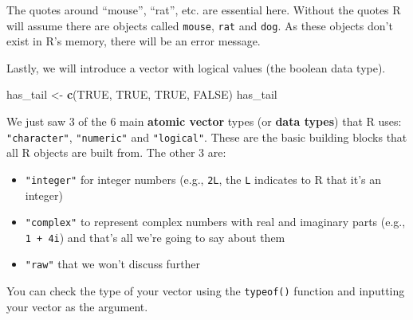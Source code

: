 \documentclass[
]{book}
\newenvironment{Shaded}{\begin{snugshade}}{\end{snugshade}}
\newcommand{\ConstantTok}[1]{\textcolor[rgb]{0.56,0.35,0.01}{#1}}
\newcommand{\FunctionTok}[1]{\textcolor[rgb]{0.13,0.29,0.53}{\textbf{#1}}}
\newcommand{\NormalTok}[1]{#1}
\newcommand{\OtherTok}[1]{\textcolor[rgb]{0.56,0.35,0.01}{#1}}
\providecommand{\tightlist}{%
  \setlength{\itemsep}{0pt}\setlength{\parskip}{0pt}}
\begin{document}
The quotes around ``mouse'', ``rat'', etc. are essential here. Without the quotes R
will assume there are objects called \texttt{mouse}, \texttt{rat} and \texttt{dog}. As these objects
don't exist in R's memory, there will be an error message.

Lastly, we will introduce a vector with logical values (the boolean data type).

\begin{Shaded}
\begin{Highlighting}[]
\NormalTok{has\_tail }\OtherTok{\textless{}{-}} \FunctionTok{c}\NormalTok{(}\ConstantTok{TRUE}\NormalTok{, }\ConstantTok{TRUE}\NormalTok{, }\ConstantTok{TRUE}\NormalTok{, }\ConstantTok{FALSE}\NormalTok{)}
\NormalTok{has\_tail }
\end{Highlighting}
\end{Shaded}

We just saw 3 of the 6 main \textbf{atomic vector} types (or \textbf{data types}) that R
uses: \texttt{"character"}, \texttt{"numeric"} and \texttt{"logical"}. These are the basic building blocks that all R objects are built from. The other 3 are:

\begin{itemize}
\tightlist
\item
  \texttt{"integer"} for integer numbers (e.g., \texttt{2L}, the \texttt{L} indicates to R that it's an integer)
\item
  \texttt{"complex"} to represent complex numbers with real and imaginary parts (e.g.,
  \texttt{1\ +\ 4i}) and that's all we're going to say about them
\item
  \texttt{"raw"} that we won't discuss further
\end{itemize}

You can check the type of your vector using the \texttt{typeof()} function and inputting your vector as the argument.
\end{document}

